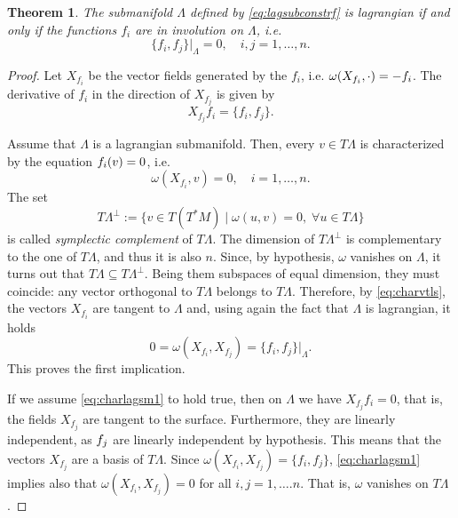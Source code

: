 \documentclass[english,fontsize=11pt,paper=a5,oneside]{scrbook}
\let\d\relax
\DeclareMathOperator{\d}{d}
\newtheorem{theorem}{Theorem}[chapter]
\theoremstyle{definition}
\begin{document}
\begin{theorem}
    The submanifold $\Lambda$ defined by \eqref{eq:lagsubconstrf} is lagrangian if and only if the functions $f_i$ are in involution on $\Lambda$, i.e.
    \begin{equation}\label{eq:charlagsm1}
        \big\{f_i, f_j\big\}\big|_\Lambda = 0, \quad i,j = 1,\ldots,n.
    \end{equation}
\end{theorem}
\begin{proof}
    Let $X_{f_i}$ be the vector fields generated by the $f_i$, i.e. $\omega(X_{f_i}, \cdot)=-\d f_i$. The derivative of $f_i$ in the direction of $X_{f_j}$ is given by
    \begin{equation}
        X_{f_j}f_i = \big\{f_i,f_j\big\}.
    \end{equation}

    Assume that $\Lambda$ is a lagrangian submanifold.
    Then, every $v\in T\Lambda$ is characterized by the equation $\d f_i(v) = 0$, i.e.
    \begin{equation}\label{eq:charvtls}
        \omega(X_{f_i}, v) = 0, \quad i=1,\ldots,n.
    \end{equation}
    The set
    \begin{equation}
        T\Lambda^\perp := \big\{v\in T(T^*M) \mid \omega(u,v) = 0, \; \forall u\in T\Lambda\big\}
    \end{equation}
    is called \emph{symplectic complement} of $T\Lambda$. The dimension of $T\Lambda^\perp$ is complementary to the one of $T\Lambda$, and thus it is also $n$. Since, by hypothesis, $\omega$ vanishes on $\Lambda$, it turns out that $T\Lambda \subseteq T\Lambda^\perp$. Being them subspaces of equal dimension, they must coincide: any vector orthogonal to $T\Lambda$ belongs to $T\Lambda$.
    Therefore, by \eqref{eq:charvtls}, the vectors $X_{f_i}$ are tangent to $\Lambda$ and, using again the fact that $\Lambda$ is lagrangian, it holds
    \begin{equation}
        0 = \omega(X_{f_i}, X_{f_j}) = \big\{f_i, f_j\big\}\big|_\Lambda.
    \end{equation}
    This proves the first implication.

    If we assume \eqref{eq:charlagsm1} to hold true, then on $\Lambda$ we have $X_{f_j}f_i = 0$, that is, the fields $X_{f_j}$ are tangent to the surface. Furthermore, they are linearly independent, as $\d f_j$ are linearly independent by hypothesis.
    This means that the vectors $X_{f_j}$ are a basis of $T\Lambda$.
    Since $\omega(X_{f_i}, X_{f_j}) = \big\{f_i,f_j\big\}$, \eqref{eq:charlagsm1} implies also that $\omega(X_{f_i}, X_{f_j}) = 0$ for all $i,j=1,\ldots.n$. That is, $\omega$ vanishes on $T\Lambda$. 
\end{proof}
\end{document}
